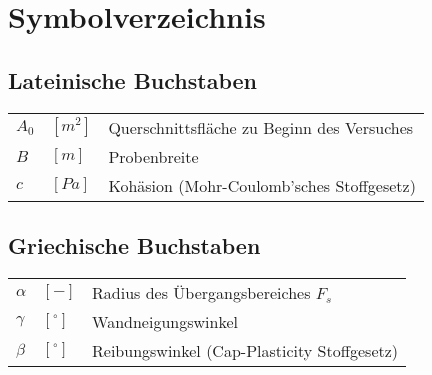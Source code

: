\chapter{Symbolverzeichnis}
\section*{Lateinische Buchstaben}

	\begin{longtable}[l]{p{1cm}p{1cm}l}
		$A_0$ & $[m^2]$ & Querschnittsfläche zu Beginn des Versuches \\
		$B$ & $[m]$ & Probenbreite\\
		$c$ & $[Pa]$ & Kohäsion (Mohr-Coulomb'sches Stoffgesetz) \\
	\end{longtable}


\section*{Griechische Buchstaben}

	\begin{longtable}[l]{p{1cm}p{1cm}l}
		$\alpha$ & $[-]$ & Radius des Übergangsbereiches $F_s$ \\
		$\gamma$ & $[^\circ]$ & Wandneigungswinkel \\
		$\beta$ & $[^\circ]$ & Reibungswinkel (Cap-Plasticity Stoffgesetz) \\	
	\end{longtable}